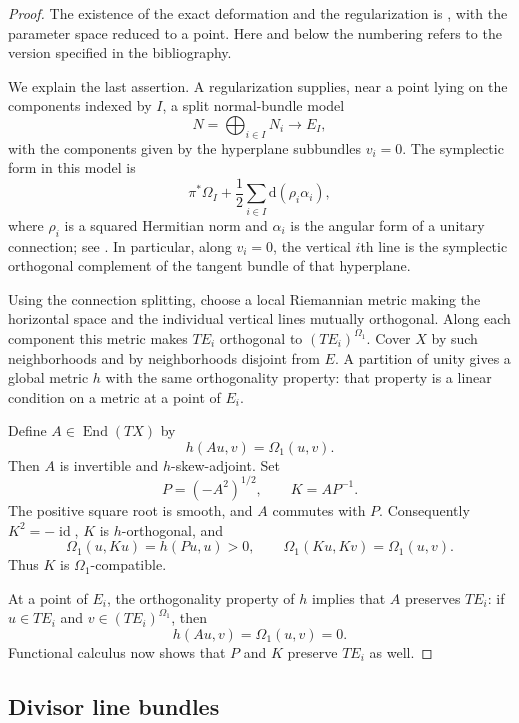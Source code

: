 \documentclass[11pt]{amsart}
\theoremstyle{definition}
\theoremstyle{remark}
\newcommand{\dd}{\mathrm d}
\newcommand{\id}{\operatorname{id}}
\newcommand{\End}{\operatorname{End}}
\begin{document}
\begin{proof}
The existence of the exact deformation and the regularization is
\cite[Theorem~2.13]{TMZ}, with the parameter space reduced to a point.
Here and below the numbering refers to the version specified in the
bibliography.

We explain the last assertion.  A regularization supplies, near a
point lying on the components indexed by $I$, a split normal-bundle
model
\[
N=\bigoplus_{i\in I}N_i\longrightarrow E_I,
\]
with the components given by the hyperplane subbundles $v_i=0$.
The symplectic form in this model is
\[
\pi^*\Omega_I+\frac12\sum_{i\in I}\dd(\rho_i\alpha_i),
\]
where $\rho_i$ is a squared Hermitian norm and $\alpha_i$ is the
angular form of a unitary connection; see \cite[Section~2.2]{TMZ}.
In particular, along $v_i=0$, the vertical $i$th line is the
symplectic orthogonal complement of the tangent bundle of that
hyperplane.

Using the connection splitting, choose a local Riemannian metric
making the horizontal space and the individual vertical lines
mutually orthogonal.  Along each component this metric makes
$TE_i$ orthogonal to $(TE_i)^{\Omega_1}$.  Cover $X$ by such
neighborhoods and by neighborhoods disjoint from $E$.  A partition
of unity gives a global metric $h$ with the same orthogonality
property: that property is a linear condition on a metric at a
point of $E_i$.

Define $A\in\End(TX)$ by
\[
h(Au,v)=\Omega_1(u,v).
\]
Then $A$ is invertible and $h$-skew-adjoint.  Set
\[
P=(-A^2)^{1/2},\qquad K=AP^{-1}.
\]
The positive square root is smooth, and $A$ commutes with $P$.
Consequently $K^2=-\id$, $K$ is $h$-orthogonal, and
\[
\Omega_1(u,Ku)=h(Pu,u)>0,\qquad
\Omega_1(Ku,Kv)=\Omega_1(u,v).
\]
Thus $K$ is $\Omega_1$-compatible.

At a point of $E_i$, the orthogonality property of $h$ implies that
$A$ preserves $TE_i$: if $u\in TE_i$ and
$v\in(TE_i)^{\Omega_1}$, then
\[
h(Au,v)=\Omega_1(u,v)=0.
\]
Functional calculus now shows that $P$ and $K$ preserve $TE_i$
as well.
\end{proof}

\subsection{Divisor line bundles}
\end{document}

